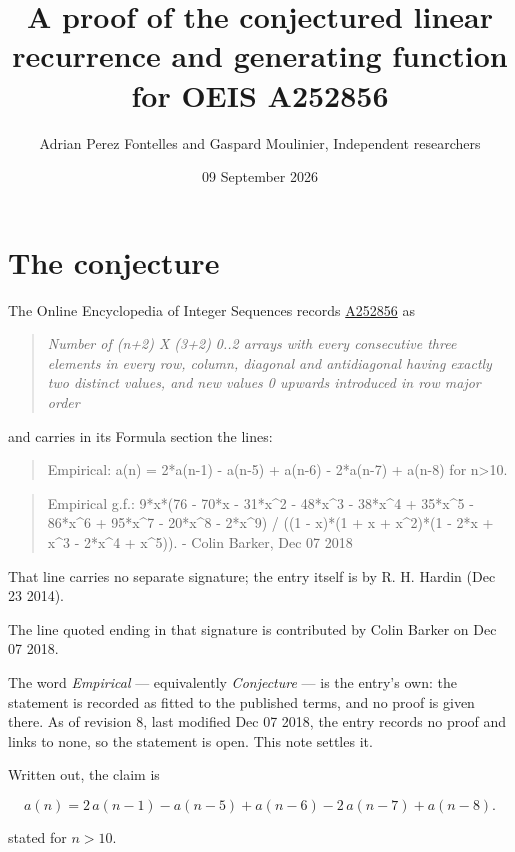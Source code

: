 \documentclass[11pt]{article}
\title{A proof of the conjectured linear recurrence and generating function for OEIS A252856}
\author{Adrian Perez Fontelles and Gaspard Moulinier, Independent researchers}
\date{09 September 2026}
\theoremstyle{definition}
\begin{document}
\maketitle
\section{The conjecture}

The Online Encyclopedia of Integer Sequences records \href{https://oeis.org/A252856}{A252856} as

\begin{quote}\itshape Number of (n+2) X (3+2) 0..2 arrays with every consecutive three elements in every row, column, diagonal and antidiagonal having exactly two distinct values, and new values 0 upwards introduced in row major order\end{quote}

and carries in its Formula section the lines:

\begin{quote}\ttfamily Empirical: a(n) = 2*a(n-1) - a(n-5) + a(n-6) - 2*a(n-7) + a(n-8) for n>10.\end{quote}

\begin{quote}\ttfamily Empirical g.f.: 9*x*(76 - 70*x - 31*x\textasciicircum{}2 - 48*x\textasciicircum{}3 - 38*x\textasciicircum{}4 + 35*x\textasciicircum{}5 - 86*x\textasciicircum{}6 + 95*x\textasciicircum{}7 - 20*x\textasciicircum{}8 - 2*x\textasciicircum{}9) / ((1 - x)*(1 + x + x\textasciicircum{}2)*(1 - 2*x + x\textasciicircum{}3 - 2*x\textasciicircum{}4 + x\textasciicircum{}5)). - Colin Barker, Dec 07 2018\end{quote}

That line carries no separate signature; the entry itself is by R. H. Hardin (Dec 23 2014).

The line quoted ending in that signature is contributed by Colin Barker on Dec 07 2018.

The word {\itshape Empirical} --- equivalently {\itshape Conjecture} --- is the entry's own: the statement is recorded as fitted to the published terms, and no proof is given there. As of revision 8, last modified Dec 07 2018, the entry records no proof and links to none, so the statement is open. This note settles it.

Written out, the claim is

\[a(n) = 2\,a(n-1) - a(n-5) + a(n-6) - 2\,a(n-7) + a(n-8).\]

stated for $n > 10$.
\end{document}
